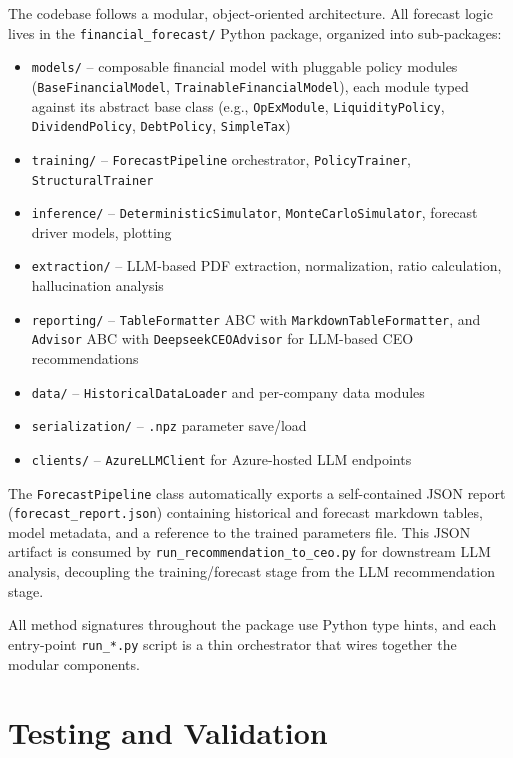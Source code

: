 \documentclass[12pt,a4paper]{article}
\begin{document}
The codebase follows a modular, object-oriented architecture. All
forecast logic lives in the \texttt{financial\_forecast/} Python package,
organized into sub-packages:

\begin{itemize}
\item \texttt{models/} -- composable financial model with pluggable policy
  modules (\texttt{BaseFinancialModel}, \texttt{TrainableFinancialModel}),
  each module typed against its abstract base class (e.g.,
  \texttt{OpExModule}, \texttt{LiquidityPolicy}, \texttt{DividendPolicy},
  \texttt{DebtPolicy}, \texttt{SimpleTax})
\item \texttt{training/} -- \texttt{ForecastPipeline} orchestrator,
  \texttt{PolicyTrainer}, \texttt{StructuralTrainer}
\item \texttt{inference/} -- \texttt{DeterministicSimulator},
  \texttt{MonteCarloSimulator}, forecast driver models, plotting
\item \texttt{extraction/} -- LLM-based PDF extraction, normalization,
  ratio calculation, hallucination analysis
\item \texttt{reporting/} -- \texttt{TableFormatter} ABC with
  \texttt{MarkdownTableFormatter}, and \texttt{Advisor} ABC with
  \texttt{DeepseekCEOAdvisor} for LLM-based CEO recommendations
\item \texttt{data/} -- \texttt{HistoricalDataLoader} and per-company
  data modules
\item \texttt{serialization/} -- \texttt{.npz} parameter save/load
\item \texttt{clients/} -- \texttt{AzureLLMClient} for Azure-hosted LLM
  endpoints
\end{itemize}

The \texttt{ForecastPipeline} class automatically exports a self-contained
JSON report (\texttt{forecast\_report.json}) containing historical and
forecast markdown tables, model metadata, and a reference to the trained
parameters file. This JSON artifact is consumed by
\texttt{run\_recommendation\_to\_ceo.py} for downstream LLM analysis,
decoupling the training/forecast stage from the LLM recommendation stage.

All method signatures throughout the package use Python type hints,
and each entry-point \texttt{run\_*.py} script is a thin orchestrator
that wires together the modular components.

\section{Testing and Validation}
\label{sec:testing}
\end{document}
